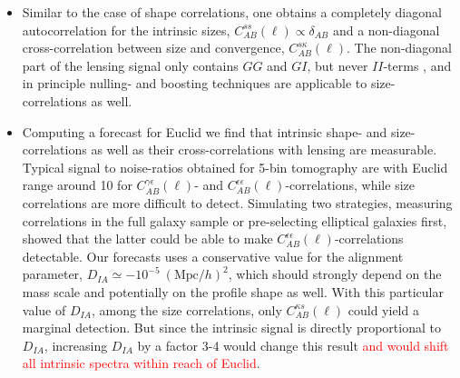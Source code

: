 \documentclass[a4paper,fleqn,usenatbib]{mnras}
\newcommand\foca[1]{\textcolor{red}{#1}}
\begin{document}
\begin{itemize}
\item{Similar to the case of shape correlations, one obtains a completely diagonal autocorrelation for the intrinsic sizes, $C^{ss}_{AB}(\ell)\propto\delta_{AB}$ and a non-diagonal cross-correlation between size and convergence, $C^{s\kappa}_{AB}(\ell)$. The non-diagonal part of the lensing signal only contains $GG$ and $GI$, but never $II$-terms \citep{jain_cross-correlation_2003, takada_tomography_2004, huterer_nulling_2005}, and in principle nulling- and boosting techniques \citep{joachimi_removal_2009, 2010arXiv1009.2024J, joachimi_intrinsic_2010} are applicable to size-correlations as well.}

\item{Computing a forecast for Euclid we find that intrinsic shape- and size-correlations as well as their cross-correlations with lensing are measurable. Typical signal to noise-ratios obtained for 5-bin tomography are with Euclid range around 10 for $C^{\gamma\epsilon}_{AB}(\ell)$- and $C^{\epsilon\epsilon}_{AB}(\ell)$-correlations, while size correlations are more difficult to detect. Simulating two strategies, measuring correlations in the full galaxy sample or pre-selecting elliptical galaxies first, showed that the latter could be able to make $C^{\epsilon\epsilon}_{AB}(\ell)$-correlations detectable. Our forecasts uses a conservative value for the alignment parameter, $D_{IA}\simeq -10^{-5}~(\mathrm{Mpc}/h)^2$, which should strongly depend on the mass scale \citep{piras_mass_2018} and potentially on the profile shape as well. With this particular value of $D_{IA}$, among the size correlations, only $C^{\kappa s}_{AB}(\ell)$ could yield a marginal detection. But since the intrinsic signal is directly proportional to $D_{IA}$, increasing $D_{IA}$ by a factor 3-4 would change this result \foca{and would shift all intrinsic spectra within reach of Euclid}.}


\end{itemize}
\end{document}
